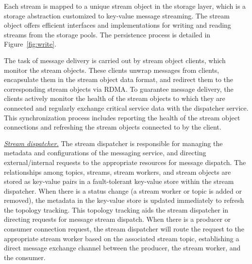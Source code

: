 Each stream is mapped to a unique stream object in the storage layer, which is a  storage abstraction customized to  key-value message streaming. The stream object offers efficient interfaces and implementations for writing and reading streams from the storage pools. The persistence process is detailed in Figure~\ref{fig:write}.

The task of message delivery is carried out by stream object clients, which monitor the stream objects. These clients unwrap messages from clients, encapsulate them in the stream object data format, and redirect them to the corresponding stream objects via RDMA. To guarantee message delivery, the clients actively monitor the health of the stream objects to which they are connected and regularly exchange critical service data with the dispatcher service. This synchronization process includes reporting the health of the stream object connections and refreshing the stream objects connected to by the client.


\noindent\underline{\textit{Stream dispatcher.}} The stream dispatcher is responsible for managing the metadata and configurations of the messaging service, and directing external/internal requests to the appropriate resources for message  dispatch. The relationships among topics, streams, stream workers, and stream objects are stored as key-value pairs in a fault-tolerant key-value store within the stream dispatcher. When there is  a status change   (\eg a stream worker or topic is added or removed), the metadata  in the key-value store is updated immediately to refresh the topology tracking. This topology tracking aids the stream dispatcher in directing requests for message stream dispatch. When there is a producer or consumer connection request, the stream dispatcher will route the request to the appropriate stream worker based on the associated stream topic, establishing a direct message exchange channel between the producer, the stream worker, and the consumer.

